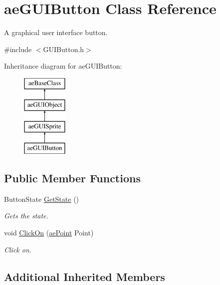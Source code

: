 \hypertarget{classae_g_u_i_button}{}\section{ae\+G\+U\+I\+Button Class Reference}
\label{classae_g_u_i_button}


A graphical user interface button.  




{\ttfamily \#include $<$G\+U\+I\+Button.\+h$>$}

Inheritance diagram for ae\+G\+U\+I\+Button\+:\begin{figure}[H]
\begin{center}
\leavevmode
\includegraphics[height=4.000000cm]{classae_g_u_i_button}
\end{center}
\end{figure}
\subsection*{Public Member Functions}
\begin{DoxyCompactItemize}
\item 
Button\+State \hyperlink{classae_g_u_i_button_a873d88936b442e7defdae182ac6b974e}{Get\+State} ()
\begin{DoxyCompactList}\small\item\em Gets the state. \end{DoxyCompactList}\item 
void \hyperlink{classae_g_u_i_button_a4700c24ed5d1a36217dcfdc5dfda41cd}{Click\+On} (\hyperlink{structae_core_1_1ae_point}{ae\+Point} Point)
\begin{DoxyCompactList}\small\item\em Click on. \end{DoxyCompactList}\end{DoxyCompactItemize}
\subsection*{Additional Inherited Members}


